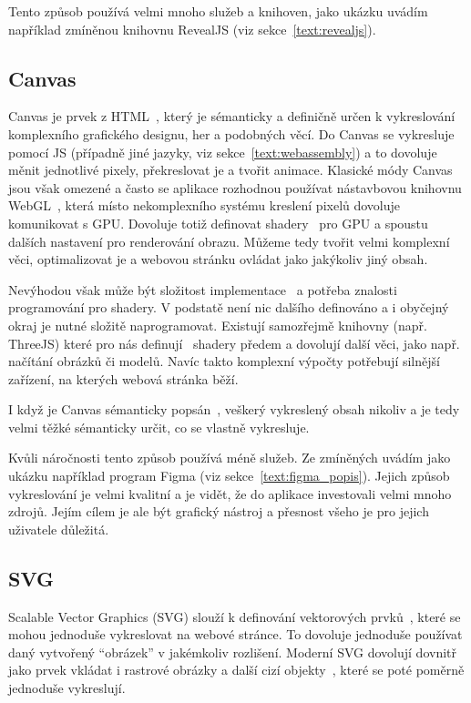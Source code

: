 Tento způsob používá velmi mnoho služeb a knihoven, jako ukázku uvádím například zmíněnou knihovnu RevealJS (viz sekce~\ref{text:revealjs}).

\subsection{Canvas}

Canvas je prvek z HTML~\cite{canvashtml5, uzayr2022frontend}, který je sémanticky a definičně určen k vykreslování komplexního grafického designu, her a podobných věcí.
Do Canvas se vykresluje pomocí JS (případně jiné jazyky, viz sekce~\ref{text:webassembly}) a to dovoluje měnit jednotlivé pixely, překreslovat je a tvořit animace.
Klasické módy Canvas jsou však omezené a často se aplikace rozhodnou používat nástavbovou knihovnu WebGL~\cite{canvashtml5}, která místo nekomplexního systému kreslení pixelů dovoluje komunikovat s GPU.
Dovoluje totiž definovat shadery~\cite{canvashtml5} pro GPU a spoustu dalších nastavení pro renderování obrazu.
Můžeme tedy tvořit velmi komplexní věci, optimalizovat je a webovou stránku ovládat jako jakýkoliv jiný obsah. 

Nevýhodou však může být složitost implementace~\cite{canvashtml5} a potřeba znalosti programování pro shadery.
V podstatě není nic dalšího definováno a i obyčejný okraj je nutné složitě naprogramovat.
Existují samozřejmě knihovny (např. ThreeJS) které pro nás definují~\cite{canvashtml5} shadery předem a dovolují další věci, jako např. načítání obrázků či modelů.
Navíc takto komplexní výpočty potřebují silnější zařízení, na kterých webová stránka běží.

I když je Canvas sémanticky popsán~\cite{canvashtml5}, veškerý vykreslený obsah nikoliv a je tedy velmi těžké sémanticky určit, co se vlastně vykresluje.

Kvůli náročnosti tento způsob používá méně služeb. 
Ze zmíněných uvádím jako ukázku například program Figma (viz sekce~\ref{text:figma_popis}).
Jejich způsob vykreslování je velmi kvalitní a je vidět, že do aplikace investovali velmi mnoho zdrojů.
Jejím cílem je ale být grafický nástroj a přesnost všeho je pro jejich uživatele důležitá.

\subsection{SVG}

Scalable Vector Graphics (SVG) slouží k definování vektorových prvků~\cite{svg_css_html}, které se mohou jednoduše vykreslovat na webové stránce.
To dovoluje jednoduše používat daný vytvořený \enquote{obrázek} v jakémkoliv rozlišení.
Moderní SVG dovolují dovnitř jako prvek vkládat i rastrové obrázky a další cizí objekty~\cite{svg_css_html, uzayr2022frontend}, které se poté poměrně jednoduše vykreslují.

